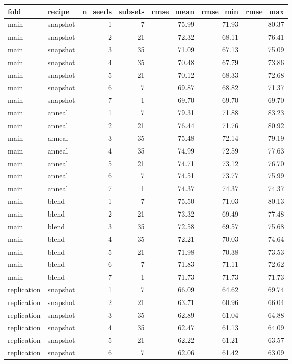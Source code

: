\begin{tabular}{llrrrrr}
\toprule
fold & recipe & n\_seeds & subsets & rmse\_mean & rmse\_min & rmse\_max \\
\midrule
main & snapshot & 1 & 7 & 75.99 & 71.93 & 80.37 \\
main & snapshot & 2 & 21 & 72.32 & 68.11 & 76.41 \\
main & snapshot & 3 & 35 & 71.09 & 67.13 & 75.09 \\
main & snapshot & 4 & 35 & 70.48 & 67.79 & 73.86 \\
main & snapshot & 5 & 21 & 70.12 & 68.33 & 72.68 \\
main & snapshot & 6 & 7 & 69.87 & 68.82 & 71.37 \\
main & snapshot & 7 & 1 & 69.70 & 69.70 & 69.70 \\
main & anneal & 1 & 7 & 79.31 & 71.88 & 83.23 \\
main & anneal & 2 & 21 & 76.44 & 71.76 & 80.92 \\
main & anneal & 3 & 35 & 75.48 & 72.14 & 79.19 \\
main & anneal & 4 & 35 & 74.99 & 72.59 & 77.63 \\
main & anneal & 5 & 21 & 74.71 & 73.12 & 76.70 \\
main & anneal & 6 & 7 & 74.51 & 73.77 & 75.99 \\
main & anneal & 7 & 1 & 74.37 & 74.37 & 74.37 \\
main & blend & 1 & 7 & 75.50 & 71.03 & 80.13 \\
main & blend & 2 & 21 & 73.32 & 69.49 & 77.48 \\
main & blend & 3 & 35 & 72.58 & 69.57 & 75.68 \\
main & blend & 4 & 35 & 72.21 & 70.03 & 74.64 \\
main & blend & 5 & 21 & 71.98 & 70.38 & 73.53 \\
main & blend & 6 & 7 & 71.83 & 71.11 & 72.62 \\
main & blend & 7 & 1 & 71.73 & 71.73 & 71.73 \\
replication & snapshot & 1 & 7 & 66.09 & 64.62 & 69.74 \\
replication & snapshot & 2 & 21 & 63.71 & 60.96 & 66.04 \\
replication & snapshot & 3 & 35 & 62.89 & 61.04 & 64.88 \\
replication & snapshot & 4 & 35 & 62.47 & 61.13 & 64.09 \\
replication & snapshot & 5 & 21 & 62.22 & 61.21 & 63.57 \\
replication & snapshot & 6 & 7 & 62.06 & 61.42 & 63.09 \\

\end{tabular}
